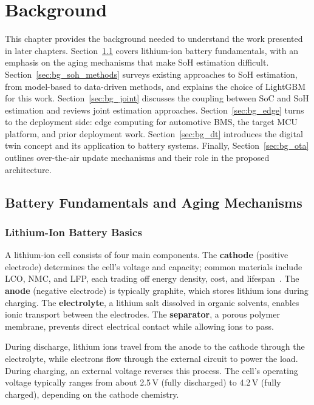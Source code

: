 \chapter{Background}
\label{background}

This chapter provides the background needed to understand the work presented in later chapters. Section~\ref{sec:bg_battery} covers lithium-ion battery fundamentals, with an emphasis on the aging mechanisms that make SoH estimation difficult. Section~\ref{sec:bg_soh_methods} surveys existing approaches to SoH estimation, from model-based to data-driven methods, and explains the choice of LightGBM for this work. Section~\ref{sec:bg_joint} discusses the coupling between SoC and SoH estimation and reviews joint estimation approaches. Section~\ref{sec:bg_edge} turns to the deployment side: edge computing for automotive BMS, the target MCU platform, and prior deployment work. Section~\ref{sec:bg_dt} introduces the digital twin concept and its application to battery systems. Finally, Section~\ref{sec:bg_ota} outlines over-the-air update mechanisms and their role in the proposed architecture.


\section{Battery Fundamentals and Aging Mechanisms}
\label{sec:bg_battery}

\subsection{Lithium-Ion Battery Basics}

A lithium-ion cell consists of four main components. The \textbf{cathode} (positive electrode) determines the cell's voltage and capacity; common materials include \gls{LCO}, \gls{NMC}, and \gls{LFP}, each trading off energy density, cost, and lifespan~\autocite{hannan2017}. The \textbf{anode} (negative electrode) is typically graphite, which stores lithium ions during charging. The \textbf{electrolyte}, a lithium salt dissolved in organic solvents, enables ionic transport between the electrodes. The \textbf{separator}, a porous polymer membrane, prevents direct electrical contact while allowing ions to pass.

During discharge, lithium ions travel from the anode to the cathode through the electrolyte, while electrons flow through the external circuit to power the load. During charging, an external voltage reverses this process. The cell's operating voltage typically ranges from about 2.5\,V (fully discharged) to 4.2\,V (fully charged), depending on the cathode chemistry.

